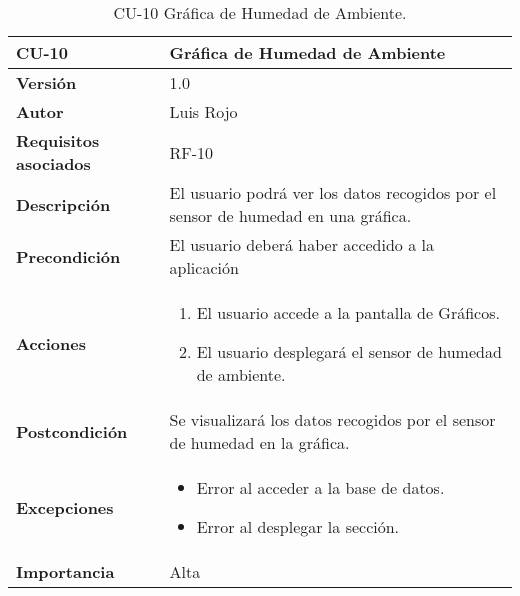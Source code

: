 \begin{table}[p]
	\centering
	\begin{tabularx}{\linewidth}{ p{} p{} }
		\toprule
		\textbf{CU-10}    & \textbf{Gráfica de Humedad de Ambiente}\\
		\toprule
		\textbf{Versión}              & 1.0    \\
		\textbf{Autor}                & Luis Rojo \\
		\textbf{Requisitos asociados} & RF-10 \\
		\textbf{Descripción}          & El usuario podrá ver los datos recogidos por el sensor de humedad en una gráfica. \\
		\textbf{Precondición}         &  El usuario deberá haber accedido a la aplicación \\
		\textbf{Acciones}             &
		\begin{enumerate}
			\def\labelenumi{\arabic{enumi}.}
			\tightlist
			\item El usuario accede a la pantalla de Gráficos.
                \item El usuario desplegará el sensor de humedad de ambiente.
		\end{enumerate}\\
		\textbf{Postcondición}        & Se visualizará los datos recogidos por el sensor de humedad en la gráfica. \\
		\textbf{Excepciones}          &  
            \begin{itemize}
                \item Error al acceder a la base de datos.
                \item Error al desplegar la sección.
            \end{itemize}
           \\
		\textbf{Importancia}          & Alta  \\
		\bottomrule
	\end{tabularx}
	\caption{CU-10 Gráfica de Humedad de Ambiente.}
\end{table}

